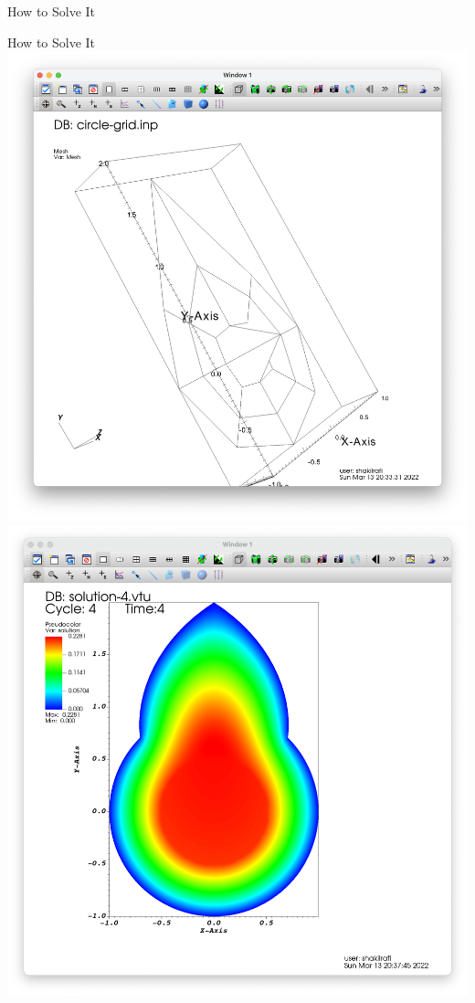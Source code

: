 \documentclass{beamer}
\begin{document}
\begin{section}{How to Solve It}
\begin{frame}{How to Solve It}
    \includegraphics[scale = 0.16]{MFDomain.png}
    \includegraphics[scale = 0.16]{MFDomainLE.png}
\end{frame}
\end{section}
\end{document}
